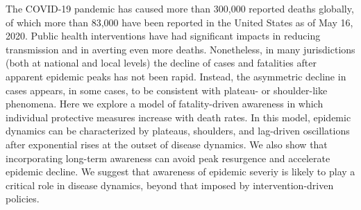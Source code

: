 The COVID-19 pandemic has caused more than 300,000 reported deaths
globally, of which more than 83,000 have been reported
in the United States as of May 16, 2020. Public health interventions
have had significant impacts in reducing transmission and in
averting even more deaths. Nonetheless, in many jurisdictions
(both at national and local levels) the decline of cases and fatalities
after apparent epidemic peaks has not been rapid.  Instead, the asymmetric
decline in cases appears, in some cases, to be consistent
with plateau- or shoulder-like phenomena.  
Here we explore a model of fatality-driven
awareness in which individual protective measures increase
with death rates.  In this model, epidemic dynamics
can be characterized by plateaus, shoulders,
and lag-driven oscillations after exponential rises
at the outset of disease dynamics. We also show that
incorporating long-term awareness can avoid peak resurgence and accelerate
epidemic decline.  We suggest that awareness of epidemic severiy 
is likely to play a critical
role in disease dynamics, beyond that imposed by intervention-driven policies.
